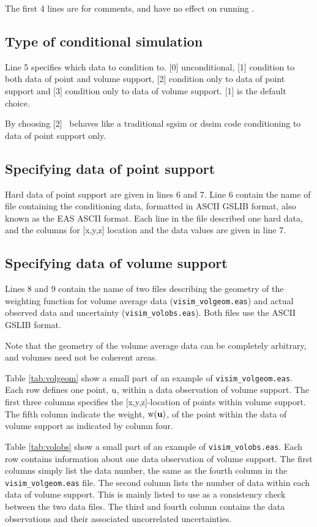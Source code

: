 \documentclass[12t]{article}
\begin{document}
The first 4 lines are for comments, and have no effect on running \visimprog.

\subsection{Type of conditional simulation}
Line 5 specifies which data to condition to. [0] unconditional, [1]
condition to both data of point and volume support, [2] condition only
to data of point support and [3] condition only to data of volume support. 
[1] is the default choice.

By choosing [2] \visimprog~behaves like a traditional sgsim or dssim
code conditioning to data of point support only.

\subsection{Specifying data of point support}
Hard data of point support are given in lines 6 and 7. Line 6 contain
the name of file containing the conditioning data, formatted in ASCII
GSLIB format, also known as the EAS ASCII format. Each line in the
file described one hard data, and the columns for [x,y,z] location and the data
values are given in line 7.

\subsection{Specifying data of volume support}
Lines 8 and 9 contain the name of two files describing the geometry of
the weighting function for volume average data (\texttt{visim\_volgeom.eas}) and actual
observed data and uncertainty (\texttt{visim\_volobs.eas}). Both files
use the ASCII GSLIB format.

Note that the geometry of the volume average data can be completely
arbitrary, and volumes need not be coherent areas.

Table \ref{tab:volgeom} show a small part of an example of \texttt{visim\_volgeom.eas}. Each row defines one point, ${\rm u}$, within a data observation of volume support.
The first three columns specifies the [x,y,z]-location of points within volume support. 
 The fifth column indicate the weight, ${\rm w}({\bf u})$, of the point within the data of volume support as indicated by column four. 

Table \ref{tab:volobs} show a small part of an example of
\texttt{visim\_volobs.eas}. Each row contains information about one
data observation of volume support. The first columns simply list the
data number, the same as the fourth column in the
\texttt{visim\_volgeom.eas} file. The second column lists the number
of data within each data of volume support. This is mainly listed to
use as a consistency check between the two data files. The third and
fourth column contains the data observations and their associated uncorrelated uncertainties.
\end{document}
